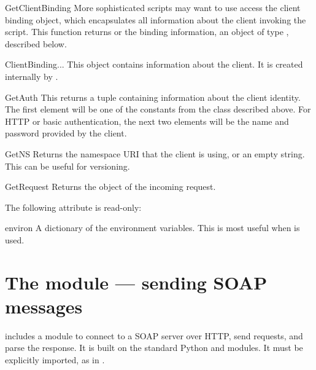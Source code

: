 \begin{methoddesc}{GetClientBinding}{}
More sophisticated scripts may want to use access the client binding object,
which encapsulates all information about the client invoking the script.
This function returns  or the binding information, an
object of type , described below.
\end{methoddesc}

\begin{classdesc}{ClientBinding}{...}
This object contains information about the client.
It is created internally by \ZSI{}.
\end{classdesc}

\begin{methoddesc}{GetAuth}{}
This returns a tuple containing information about the client identity.
The first element will be one of the constants from the  class
described above.
For HTTP or \ZSI{} basic authentication, the next two elements will be
the name and password provided by the client.
\end{methoddesc}

\begin{methoddesc}{GetNS}{}
Returns the namespace URI that the client is using, or an empty string.
This can be useful for versioning.
\end{methoddesc}

\begin{methoddesc}{GetRequest}{}
Returns the  object of the incoming request.
\end{methoddesc}

The following attribute is read-only:

\begin{memberdesc}{environ}
A dictionary of the environment variables.
This is most useful when  is used.
\end{memberdesc}

\section{The  module --- sending SOAP messages}

\ZSI{} includes a module to connect to a SOAP server over HTTP, send requests,
and parse the response.
It is built on the standard Python  and 
modules.
It must be explicitly imported, as in
.


